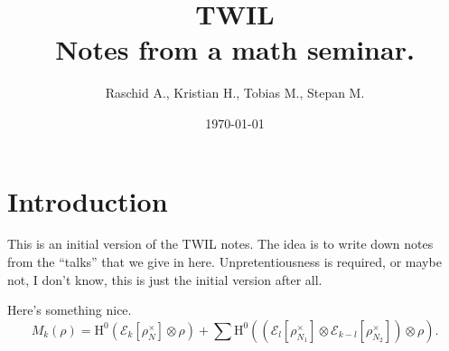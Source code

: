 \documentclass{article}
\title{TWIL\\Notes from a math seminar.}
\author{Raschid A., Kristian H., Tobias M., Stepan M.}
\date{\today}
\begin{document}
\maketitle
\section{Introduction}
This is an initial version of the TWIL notes. The idea is to write down notes from the ``talks'' that we give in here. Unpretentiousness is required, or maybe not, I don't know, this is just the initial version after all.

Here's something nice.
\[M_k(\rho)=\mathrm{H}^0(\mathcal{E}_k[\rho_N^\times]\otimes\rho)+\sum\mathrm{H}^0((\mathcal{E}_l[\rho_{N_1}^\times]\otimes\mathcal{E}_{k-l}[\rho_{N_2}^\times])\otimes\rho).\]
\end{document}
